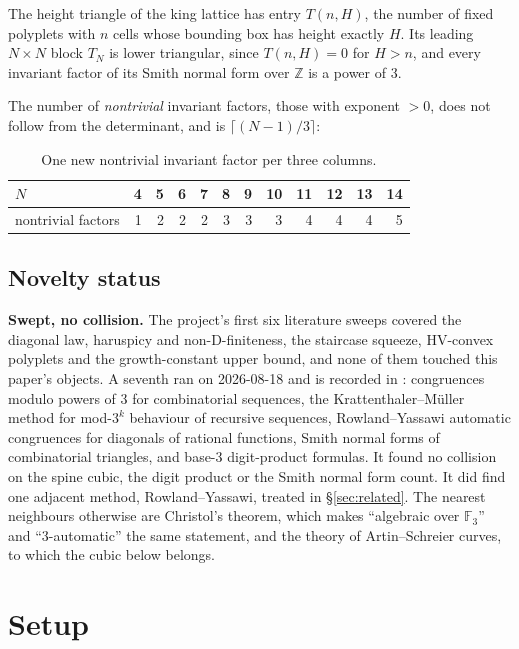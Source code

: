 \documentclass[11pt]{article}
\newcommand{\Z}{\mathbb{Z}}
\newcommand{\F}{\mathbb{F}}
\begin{document}
The height triangle of the king lattice has entry $T(n,H)$, the number of fixed
polyplets with $n$ cells whose bounding box has height exactly $H$. Its
leading $N \times N$ block $T_N$ is lower triangular, since $T(n,H) = 0$ for
$H > n$, and every invariant factor of its Smith normal form over $\Z$ is a
power of $3$.

The number of \emph{nontrivial} invariant factors, those with exponent $> 0$,
does not follow from the determinant, and is $\lceil (N-1)/3\rceil$:

\begin{table}[H]
\centering\small
\begin{tabular}{l r r r r r r r r r r r}
\toprule
$N$ & 4 & 5 & 6 & 7 & 8 & 9 & 10 & 11 & 12 & 13 & 14 \\
\midrule
nontrivial factors & 1 & 2 & 2 & 2 & 3 & 3 & 3 & 4 & 4 & 4 & 5 \\
\bottomrule
\end{tabular}
\caption{One new nontrivial invariant factor per three columns.}
\label{tab:snfcount}
\end{table}

\subsection{Novelty status}
\label{sec:novelty}

\textbf{Swept, no collision.} The project's first six literature sweeps covered
the diagonal law, haruspicy and non-D-finiteness, the staircase squeeze,
HV-convex polyplets and the growth-constant upper bound, and none of them
touched this paper's objects. A seventh ran on 2026-08-18 and is recorded in
: congruences modulo powers of $3$ for
combinatorial sequences, the Krattenthaler--M\"uller method for mod-$3^k$
behaviour of recursive sequences, Rowland--Yassawi automatic congruences for
diagonals of rational functions, Smith normal forms of combinatorial triangles,
and base-$3$ digit-product formulas. It found no collision on the spine cubic,
the digit product or the Smith normal form count. It did find one
adjacent method, Rowland--Yassawi, treated in \S\ref{sec:related}. The nearest
neighbours otherwise are Christol's theorem, which makes ``algebraic over
$\F_3$'' and ``$3$-automatic'' the same statement, and the theory of
Artin--Schreier curves, to which the cubic below belongs.

\section{Setup}
\label{sec:setup}
\end{document}
